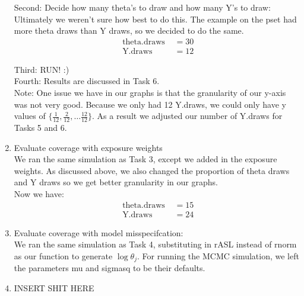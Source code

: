 \documentclass[paper=a4, fontsize=11pt]{scrartcl}
\begin{document}
\begin{enumerate}
      Second: Decide how many theta's to draw and how many Y's to draw: \\
        Ultimately we weren't sure how best to do this. The example on the pset had more theta draws than Y draws, so we decided to do the same.
        \begin{align*}
          \text{ theta.draws } &= 30 \\
          \text{ Y.draws } &= 12
        \end{align*}

      Third: RUN! :) \\

      Fourth: Results are discussed in Task 6. \\

      Note: One issue we have in our graphs is that the granularity of our y-axis was not very good. Because we only had 12 Y.draws, we could only have y values of $\{\frac{1}{12}, \frac{2}{12}, \ldots \frac{12}{12}\}$. As a result we adjusted our number of Y.draws for Tasks 5 and 6.
    \item Evaluate coverage with exposure weights \\

      We ran the same simulation as Task 3, except we added in the exposure weights. As discussed above, we also changed the proportion of theta draws and Y draws so we get better granularity in our graphs. \\
      Now we have:
      \begin{align*}
          \text{ theta.draws } &= 15 \\
          \text{ Y.draws } &= 24
      \end{align*}
    \item Evaluate coverage with model misspecifcation: \\

      We ran the same simulation as Task 4, substituting in rASL instead of rnorm as our function to generate $\log{\theta_j}$. For running the MCMC simulation, we left the parameters mu and sigmasq to be their defaults.
    \item INSERT SHIT HERE
  \end{enumerate}
\end{document}
